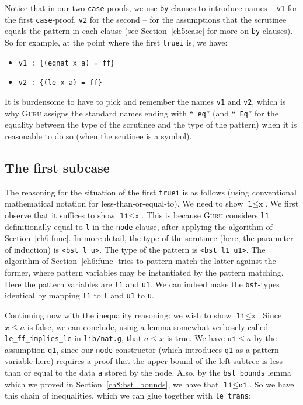 \documentclass{book}[12pt]
\newcommand{\guru}[0]{\textsc{Guru}\xspace}
\begin{document}
\noindent Notice that in our two \texttt{case}-proofs, we use
\texttt{by}-clauses to introduce names -- \texttt{v1} for the first
\texttt{case}-proof, \texttt{v2} for the second -- for the assumptions
that the scrutinee equals the pattern in each clause (see
Section~\ref{ch5:case} for more on \texttt{by}-clauses).  So for example,
at the point where the first \texttt{truei} is, we have:

\begin{itemize}
\item \texttt{v1 : \{(eqnat x a) = ff\}}
\item \texttt{v2 : \{(le x a) = ff\}}
\end{itemize}

\noindent It is burdensome to have to pick and remember the names
\texttt{v1} and \texttt{v2}, which is why \guru assigns the standard
names ending with ``\texttt{\_eq}'' (and ``\texttt{\_Eq}'' for the
equality between the type of the scrutinee and the type of the
pattern) when it is reasonable to do so (when the scutinee is a
symbol).  

\subsection{The first subcase}

The reasoning for the situation of the first \texttt{truei} is as
follows (using conventional mathematical notation for
less-than-or-equal-to).  We need to show $\texttt{l} \le \texttt{x}$.
We first observe that it suffices to show $\texttt{l1} \le
\texttt{x}$.  This is because \guru considers \texttt{l1}
definitionally equal to \texttt{l} in the \texttt{node}-clause, after
applying the algorithm of Section~\ref{ch6:func}.  In more detail, the
type of the scrutinee (here, the parameter of induction) is
\texttt{<bst l u>}.  The type of the pattern is \texttt{<bst l1 u1>}.
The algorithm of Section~\ref{ch6:func} tries to pattern match the
latter against the former, where pattern variables may be instantiated
by the pattern matching.  Here the pattern variables are \texttt{l1}
and \texttt{u1}.  We can indeed make the \texttt{bst}-types identical
by mapping \texttt{l1} to \texttt{l} and \texttt{u1} to \texttt{u}.

Continuing now with the inequality reasoning: we wish to show
$\texttt{l1} \le \texttt{x}$.  Since $x \le a$ is false, we can
conclude, using a lemma somewhat verbosely called
\texttt{le\_ff\_implies\_le} in \texttt{lib/nat.g}, that $a \le x$ is
true.  We have $\texttt{u1} \le a$ by the assumption \texttt{q1},
since our \texttt{node} constructor (which introduces \texttt{q1} as a
pattern variable here) requires a proof that the upper bound of the
left subtree is less than or equal to the data \texttt{a} stored by
the node.  Also, by the \texttt{bst\_bounds} lemma which we proved in
Section~\ref{ch8:bst_bounds}, we have that $\texttt{l1} \le
\texttt{u1}$.  So we have this chain of inequalities, which we can
glue together with \texttt{le\_trans}:
\end{document}

